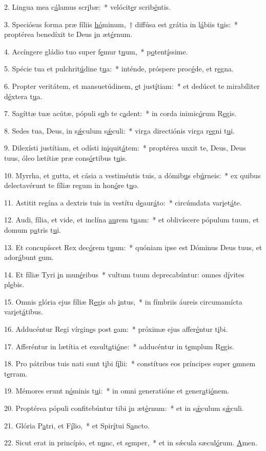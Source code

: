 2. Lingua mea c\uline{á}lamus scr\uline{i}bæ:~* velócit\uline{e}r scrib\uline{é}ntis.\par 
3. Speciósus forma præ fíliis \uline{hó}minum,~† diffúsa est grátia in l\uline{á}biis t\uline{u}is:~* proptérea benedíxit te Deus \uline{i}n æt\uline{é}rnum.\par 
4. Accíngere gládio tuo super f\uline{e}mur t\uline{u}um,~* p\uline{o}tent\uline{í}ssime.\par 
5. Spécie tua et pulchrit\uline{ú}dine t\uline{u}a:~* inténde, próspere proc\uline{é}de, et r\uline{e}gna.\par 
6. Propter veritátem, et mansuetúdinem, \uline{e}t just\uline{í}tiam:~* et dedúcet te mirabíliter d\uline{é}xtera t\uline{u}a.\par 
7. Sagíttæ tuæ acútæ, pópuli s\uline{u}b te c\uline{a}dent:~* in corda inimic\uline{ó}rum R\uline{e}gis.\par 
8. Sedes tua, Deus, in s\uline{ǽ}culum s\uline{ǽ}culi:~* virga directiónis virga r\uline{e}gni t\uline{u}i.\par 
9. Dilexísti justítiam, et odísti in\uline{i}quit\uline{á}tem:~* proptérea unxit te, Deus, Deus tuus, óleo lætítiæ præ cons\uline{ó}rtibus t\uline{u}is.\par 
10. Myrrha, et gutta, et cásia a vestiméntis tuis, a dómib\uline{u}s eb\uline{ú}rneis:~* ex quibus delectavérunt te fíliæ regum in hon\uline{ó}re t\uline{u}o.\par 
11. Astitit regína a dextris tuis in vestítu d\uline{e}aur\uline{á}to:~* circúmdata var\uline{i}et\uline{á}te.\par 
12. Audi, fília, et vide, et inclína \uline{au}rem t\uline{u}am:~* et oblivíscere pópulum tuum, et domum p\uline{a}tris t\uline{u}i.\par 
13. Et concupíscet Rex dec\uline{ó}rem t\uline{u}um:~* quóniam ipse est Dóminus Deus tuus, et ador\uline{á}bunt \uline{e}um.\par 
14. Et fíliæ Tyri \uline{i}n mun\uline{é}ribus~* vultum tuum deprecabúntur: omnes d\uline{í}vites pl\uline{e}bis.\par 
15. Omnis glória ejus fíliæ R\uline{e}gis ab \uline{i}ntus,~* in fímbriis áureis circumamícta var\uline{i}et\uline{á}tibus.\par 
16. Adducéntur Regi vírgin\uline{e}s post \uline{e}am:~* próximæ ejus affer\uline{é}ntur t\uline{i}bi.\par 
17. Afferéntur in lætítia et exsult\uline{a}ti\uline{ó}ne:~* adducéntur in t\uline{e}mplum R\uline{e}gis.\par 
18. Pro pátribus tuis nati sunt t\uline{i}bi f\uline{í}lii:~* constítues eos príncipes super \uline{o}mnem t\uline{e}rram.\par 
19. Mémores erunt n\uline{ó}minis t\uline{u}i:~* in omni generatióne et gener\uline{a}ti\uline{ó}nem.\par 
20. Proptérea pópuli confitebúntur tibi \uline{i}n æt\uline{é}rnum:~* et in s\uline{ǽ}culum s\uline{ǽ}culi.\par 
21. Glória P\uline{a}tri, et F\uline{í}lio,~* et Spir\uline{í}tui S\uline{a}ncto.\par 
22. Sicut erat in princípio, et n\uline{u}nc, et s\uline{e}mper,~* et in sǽcula sæcul\uline{ó}rum. \uline{A}men.\par 
